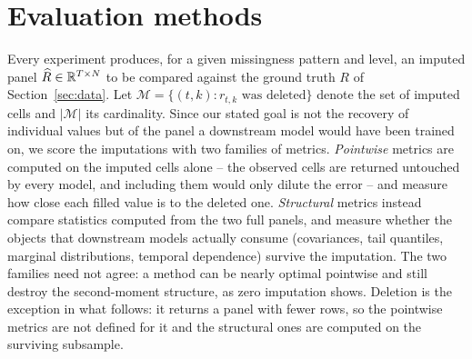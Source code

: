 \section{Evaluation methods}
\label{sec:eval}

Every experiment produces, for a given missingness pattern and level, an
imputed panel $\widehat{R} \in \mathbb{R}^{T \times N}$ to be compared against the
ground truth $R$ of Section~\ref{sec:data}. Let
$\mathcal{M} = \{(t,k) : r_{t,k} \text{ was deleted}\}$ denote the set of
imputed cells and $|\mathcal{M}|$ its cardinality. Since our stated goal is
not the recovery of individual values but of the panel a downstream model
would have been trained on, we score the imputations with two families of
metrics. \emph{Pointwise} metrics are computed on the imputed cells alone
-- the observed cells are returned untouched by every model, and including
them would only dilute the error -- and measure how close each filled value
is to the deleted one. \emph{Structural} metrics instead compare statistics
computed from the two full panels, and measure whether the objects that
downstream models actually consume (covariances, tail quantiles, marginal
distributions, temporal dependence) survive the imputation. The two families need
not agree: a method can be nearly optimal pointwise and still destroy the
second-moment structure, as zero imputation shows. Deletion is the
exception in what follows: it returns a panel with fewer rows, so the
pointwise metrics are not defined for it and the structural ones are
computed on the surviving subsample.

